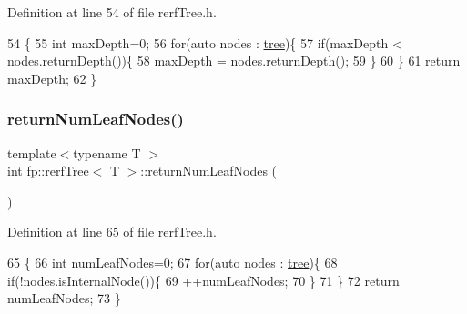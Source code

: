 Definition at line 54 of file rerf\+Tree.\+h.


\begin{DoxyCode}
54                                            \{
55                     \textcolor{keywordtype}{int} maxDepth=0;
56                     \textcolor{keywordflow}{for}(\textcolor{keyword}{auto} nodes : \hyperlink{classfp_1_1rerfTree_afc9392154cb4d1dde02e26a9ec31e356}{tree})\{
57                         \textcolor{keywordflow}{if}(maxDepth < nodes.returnDepth())\{
58                             maxDepth = nodes.returnDepth();
59                         \}
60                     \}
61                     \textcolor{keywordflow}{return} maxDepth;
62                 \}
\end{DoxyCode}
\mbox{\label{classfp_1_1rerfTree_ad5ff10663021ec1abfd6cc0dfb7f9408}} 
\subsubsection{\texorpdfstring{return\+Num\+Leaf\+Nodes()}{returnNumLeafNodes()}}
{\footnotesize\ttfamily template$<$typename T $>$ \\
int \hyperlink{classfp_1_1rerfTree}{fp\+::rerf\+Tree}$<$ T $>$\+::return\+Num\+Leaf\+Nodes (\begin{DoxyParamCaption}{ }\end{DoxyParamCaption})\hspace{0.3cm}{\ttfamily [inline]}}



Definition at line 65 of file rerf\+Tree.\+h.


\begin{DoxyCode}
65                                                \{
66                     \textcolor{keywordtype}{int} numLeafNodes=0;
67                     \textcolor{keywordflow}{for}(\textcolor{keyword}{auto} nodes : \hyperlink{classfp_1_1rerfTree_afc9392154cb4d1dde02e26a9ec31e356}{tree})\{
68                         \textcolor{keywordflow}{if}(!nodes.isInternalNode())\{
69                             ++numLeafNodes;
70                         \}
71                     \}
72                     \textcolor{keywordflow}{return} numLeafNodes;
73                 \}
\end{DoxyCode}
\mbox{\label{classfp_1_1rerfTree_aafda414eef799af60a01fb2a45cc81f8}} 
